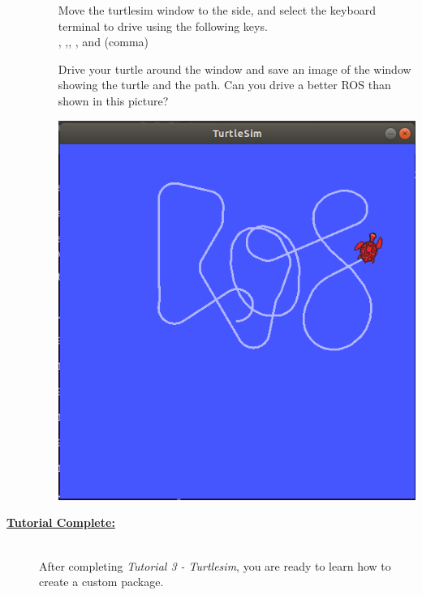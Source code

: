 \documentclass[12pt]{article}
\newcommand{\I}{\raisebox{-0.1em}{I}}
\newcommand{\IKey}{\keystroke{\I}}
\newcommand{\Kay}{\raisebox{-0.1em}{K}}
\newcommand{\KayKey}{\keystroke{\Kay}}
\newcommand{\J}{\raisebox{-0.1em}{J}}
\newcommand{\JKey}{\keystroke{\J}}
\newcommand{\EL}{\raisebox{-0.1em}{L}}
\newcommand{\ELKey}{\keystroke{\EL}}
\newcommand{\COMMA}{\raisebox{-0.1em}{,}}
\newcommand{\COMMAKey}{\keystroke{\COMMA}}
\begin{document}
\begin{description}
\begin{enumerate}
\begin{multicols}{2}

\begin{framed}
Move the turtlesim window to the side, and select the keyboard terminal to drive using the following keys.\vspace{2mm}\\ \IKey, \JKey,\KayKey, \ELKey, and \COMMAKey (comma) \vspace{5mm}

Drive your turtle around the window and save an image of the window showing the turtle and the path. Can you drive a better ROS than shown in this picture? 
\end{framed}

\includegraphics[scale=0.35]{tutorial3_fig1.png}	
\end{multicols}			
			
\end{enumerate}  

\item[\textbf{\underline{Tutorial Complete:}}] \hfill \vspace{3mm}\\
After completing {\it Tutorial 3 - Turtlesim}, you are ready to learn how to create a custom package.



\end{description}
\end{document}
